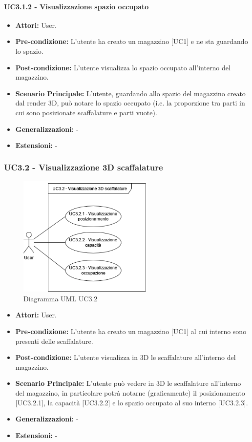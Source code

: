 \paragraph{UC3.1.2 - Visualizzazione spazio occupato}
\begin{itemize}
    \item \textbf{Attori:} User.
    \item \textbf{Pre-condizione:} L'utente ha creato un magazzino [UC1] e ne sta guardando lo spazio.
    \item \textbf{Post-condizione:} L'utente visualizza lo spazio occupato all'interno del magazzino.
    \item \textbf{Scenario Principale:}  L'utente, guardando allo spazio del magazzino creato dal render 3D, può notare lo spazio occupato (i.e. la proporzione tra parti in cui sono posizionate scaffalature e parti vuote).
    \item \textbf{Generalizzazioni:} -
    \item \textbf{Estensioni:} -
\end{itemize}


\subsubsection{UC3.2 - Visualizzazione 3D scaffalature}
\begin{figure}[H]
  \centering
  \includegraphics[width=0.6\textwidth]{UC_diagrams_1-10/UC3.2.drawio.png}
   \caption{Diagramma UML UC3.2}
\end{figure}
\begin{itemize}
    \item \textbf{Attori:} User.
    \item \textbf{Pre-condizione:} L'utente ha creato un magazzino [UC1] al cui interno sono presenti delle scaffalature.
    \item \textbf{Post-condizione:} L'utente visualizza in 3D le scaffalature all'interno del magazzino.
    \item \textbf{Scenario Principale:}  L'utente può vedere in 3D le scaffalature all'interno del magazzino, in particolare potrà notarne (graficamente) il posizionamento [UC3.2.1], la capacità [UC3.2.2] e lo spazio occupato al suo interno [UC3.2.3].
    \item \textbf{Generalizzazioni:} -
    \item \textbf{Estensioni:} -
\end{itemize}


